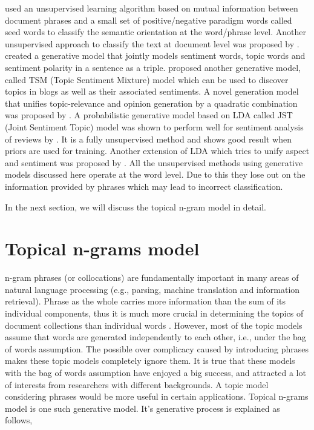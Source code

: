 \citep*{turney2002thumbs} used an unsupervised learning algorithm based on mutual information between document phrases and a small set of positive/negative paradigm 
words called seed words to classify the semantic orientation at the word/phrase level. Another unsupervised approach to classify the text at document level was proposed
by \citep*{turney2002unsupervised}. \citep*{eguchi2006sentiment} created a generative model that jointly models sentiment words, topic words and sentiment polarity 
in a sentence as a triple. \citep*{mei2007topic} proposed another generative model, called TSM (Topic Sentiment Mixture) model which can be used to discover topics 
in blogs as well as their associated sentiments. A novel generation model that unifies topic-relevance and opinion generation by a quadratic combination was proposed 
by \citep*{zhang2008generation}. A probabilistic generative model based on LDA called JST (Joint Sentiment Topic) model was shown to perform well for sentiment analysis 
of reviews by \citep*{lin2009joint}. It is a fully unsupervised method and shows good result when priors are used for training. Another extension of LDA which tries
to unify aspect and sentiment was proposed by \citep*{jo2011aspect}. All the unsupervised methods using generative models discussed here operate at the word level. 
Due to this they lose out on the information provided by phrases which may lead to incorrect classification.

In the next section, we will discuss the topical n-gram model in detail.

\section{Topical n-grams model}

n-gram phrases (or collocations) are fundamentally important in many areas of natural language processing (e.g., parsing, machine translation and information retrieval). 
Phrase as the whole carries more information than the sum of its individual components, thus it is much more crucial in determining the topics of document collections 
than individual words \citep*{wang2005note}. However, most of the topic models assume that words are generated independently to each other, i.e., under the bag of words
assumption. The possible over complicacy caused by introducing phrases makes these topic models completely ignore them. It is true that these models with the bag of words
assumption have enjoyed a big success, and attracted a lot of interests from researchers with different backgrounds. A topic model considering phrases would be more 
useful in certain applications. Topical n-grams model is one such generative model. It's generative process is explained as follows,

